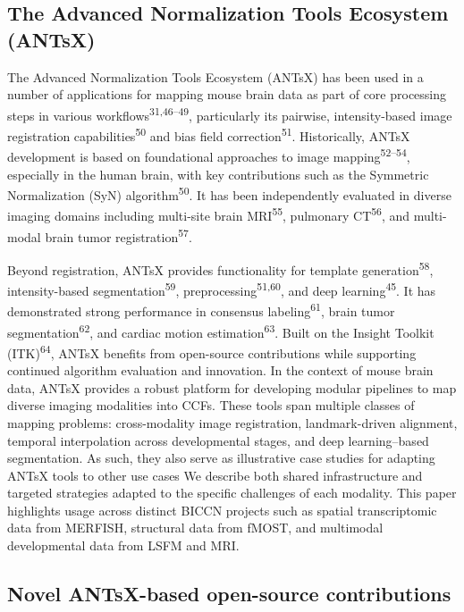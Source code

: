 \documentclass[
  12pt,
]{article}
\begin{document}
\subsection{The Advanced Normalization Tools Ecosystem
(ANTsX)}\label{the-advanced-normalization-tools-ecosystem-antsx}

The Advanced Normalization Tools Ecosystem (ANTsX) has been used in a
number of applications for mapping mouse brain data as part of core
processing steps in various workflows\textsuperscript{31,46--49},
particularly its pairwise, intensity-based image registration
capabilities\textsuperscript{50} and bias field
correction\textsuperscript{51}. Historically, ANTsX development is based
on foundational approaches to image mapping\textsuperscript{52--54},
especially in the human brain, with key contributions such as the
Symmetric Normalization (SyN) algorithm\textsuperscript{50}. It has been
independently evaluated in diverse imaging domains including multi-site
brain MRI\textsuperscript{55}, pulmonary CT\textsuperscript{56}, and
multi-modal brain tumor registration\textsuperscript{57}.

Beyond registration, ANTsX provides functionality for template
generation\textsuperscript{58}, intensity-based
segmentation\textsuperscript{59}, preprocessing\textsuperscript{51,60},
and deep learning\textsuperscript{45}. It has demonstrated strong
performance in consensus labeling\textsuperscript{61}, brain tumor
segmentation\textsuperscript{62}, and cardiac motion
estimation\textsuperscript{63}. Built on the Insight Toolkit
(ITK)\textsuperscript{64}, ANTsX benefits from open-source contributions
while supporting continued algorithm evaluation and innovation. In the
context of mouse brain data, ANTsX provides a robust platform for
developing modular pipelines to map diverse imaging modalities into
CCFs. These tools span multiple classes of mapping problems:
cross-modality image registration, landmark-driven alignment, temporal
interpolation across developmental stages, and deep learning--based
segmentation. As such, they also serve as illustrative case studies for
adapting ANTsX tools to other use cases We describe both shared
infrastructure and targeted strategies adapted to the specific
challenges of each modality. This paper highlights usage across distinct
BICCN projects such as spatial transcriptomic data from MERFISH,
structural data from fMOST, and multimodal developmental data from LSFM
and MRI.

\subsection{Novel ANTsX-based open-source
contributions}\label{novel-antsx-based-open-source-contributions}
\end{document}
